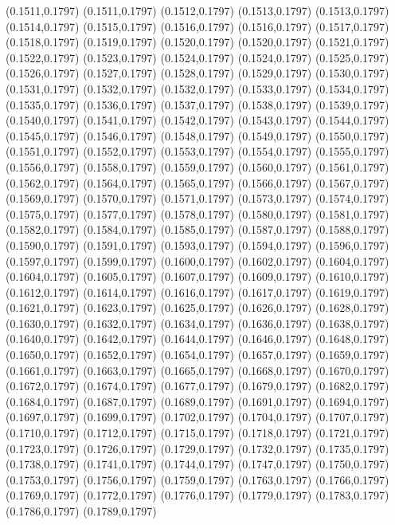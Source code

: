 (0.1511,0.1797)
(0.1511,0.1797)
(0.1512,0.1797)
(0.1513,0.1797)
(0.1513,0.1797)
(0.1514,0.1797)
(0.1515,0.1797)
(0.1516,0.1797)
(0.1516,0.1797)
(0.1517,0.1797)
(0.1518,0.1797)
(0.1519,0.1797)
(0.1520,0.1797)
(0.1520,0.1797)
(0.1521,0.1797)
(0.1522,0.1797)
(0.1523,0.1797)
(0.1524,0.1797)
(0.1524,0.1797)
(0.1525,0.1797)
(0.1526,0.1797)
(0.1527,0.1797)
(0.1528,0.1797)
(0.1529,0.1797)
(0.1530,0.1797)
(0.1531,0.1797)
(0.1532,0.1797)
(0.1532,0.1797)
(0.1533,0.1797)
(0.1534,0.1797)
(0.1535,0.1797)
(0.1536,0.1797)
(0.1537,0.1797)
(0.1538,0.1797)
(0.1539,0.1797)
(0.1540,0.1797)
(0.1541,0.1797)
(0.1542,0.1797)
(0.1543,0.1797)
(0.1544,0.1797)
(0.1545,0.1797)
(0.1546,0.1797)
(0.1548,0.1797)
(0.1549,0.1797)
(0.1550,0.1797)
(0.1551,0.1797)
(0.1552,0.1797)
(0.1553,0.1797)
(0.1554,0.1797)
(0.1555,0.1797)
(0.1556,0.1797)
(0.1558,0.1797)
(0.1559,0.1797)
(0.1560,0.1797)
(0.1561,0.1797)
(0.1562,0.1797)
(0.1564,0.1797)
(0.1565,0.1797)
(0.1566,0.1797)
(0.1567,0.1797)
(0.1569,0.1797)
(0.1570,0.1797)
(0.1571,0.1797)
(0.1573,0.1797)
(0.1574,0.1797)
(0.1575,0.1797)
(0.1577,0.1797)
(0.1578,0.1797)
(0.1580,0.1797)
(0.1581,0.1797)
(0.1582,0.1797)
(0.1584,0.1797)
(0.1585,0.1797)
(0.1587,0.1797)
(0.1588,0.1797)
(0.1590,0.1797)
(0.1591,0.1797)
(0.1593,0.1797)
(0.1594,0.1797)
(0.1596,0.1797)
(0.1597,0.1797)
(0.1599,0.1797)
(0.1600,0.1797)
(0.1602,0.1797)
(0.1604,0.1797)
\PST@Solid(0.1604,0.1797)
(0.1605,0.1797)
(0.1607,0.1797)
(0.1609,0.1797)
(0.1610,0.1797)
(0.1612,0.1797)
(0.1614,0.1797)
(0.1616,0.1797)
(0.1617,0.1797)
(0.1619,0.1797)
(0.1621,0.1797)
(0.1623,0.1797)
(0.1625,0.1797)
(0.1626,0.1797)
(0.1628,0.1797)
(0.1630,0.1797)
(0.1632,0.1797)
(0.1634,0.1797)
(0.1636,0.1797)
(0.1638,0.1797)
(0.1640,0.1797)
(0.1642,0.1797)
(0.1644,0.1797)
(0.1646,0.1797)
(0.1648,0.1797)
(0.1650,0.1797)
(0.1652,0.1797)
(0.1654,0.1797)
(0.1657,0.1797)
(0.1659,0.1797)
(0.1661,0.1797)
(0.1663,0.1797)
(0.1665,0.1797)
(0.1668,0.1797)
(0.1670,0.1797)
(0.1672,0.1797)
(0.1674,0.1797)
(0.1677,0.1797)
(0.1679,0.1797)
(0.1682,0.1797)
(0.1684,0.1797)
(0.1687,0.1797)
(0.1689,0.1797)
(0.1691,0.1797)
(0.1694,0.1797)
(0.1697,0.1797)
(0.1699,0.1797)
(0.1702,0.1797)
(0.1704,0.1797)
(0.1707,0.1797)
(0.1710,0.1797)
(0.1712,0.1797)
(0.1715,0.1797)
(0.1718,0.1797)
(0.1721,0.1797)
(0.1723,0.1797)
(0.1726,0.1797)
(0.1729,0.1797)
(0.1732,0.1797)
(0.1735,0.1797)
(0.1738,0.1797)
(0.1741,0.1797)
(0.1744,0.1797)
(0.1747,0.1797)
(0.1750,0.1797)
(0.1753,0.1797)
(0.1756,0.1797)
(0.1759,0.1797)
(0.1763,0.1797)
(0.1766,0.1797)
(0.1769,0.1797)
(0.1772,0.1797)
(0.1776,0.1797)
(0.1779,0.1797)
(0.1783,0.1797)
(0.1786,0.1797)
(0.1789,0.1797)
